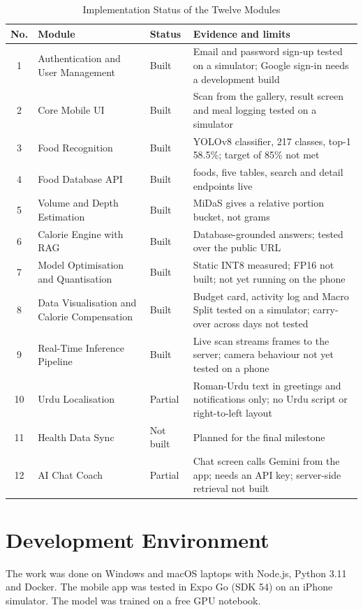 \begin{table}[H]
\centering
\caption{Implementation Status of the Twelve Modules}
\label{tab:status}
\small
\begin{tabularx}{\textwidth}{|c|>{\raggedright\arraybackslash}p{4.2cm}|>{\raggedright\arraybackslash}p{2.2cm}|>{\raggedright\arraybackslash}X|}
\hline
\textbf{No.} & \textbf{Module} & \textbf{Status} & \textbf{Evidence and limits} \\ \hline
1 & Authentication and User Management & Built & Email and password sign-up tested on a simulator; Google sign-in needs a development build \\ \hline
2 & Core Mobile UI & Built & Scan from the gallery, result screen and meal logging tested on a simulator \\ \hline
3 & Food Recognition & Built & YOLOv8 classifier, 217 classes, top-1 58.5\%; target of 85\% not met \\ \hline
4 & Food Database API & Built & 160 foods, five tables, search and detail endpoints live \\ \hline
5 & Volume and Depth Estimation & Built & MiDaS gives a relative portion bucket, not grams \\ \hline
6 & Calorie Engine with RAG & Built & Database-grounded answers; tested over the public URL \\ \hline
7 & Model Optimisation and Quantisation & Built & Static INT8 measured; FP16 not built; not yet running on the phone \\ \hline
8 & Data Visualisation and Calorie Compensation & Built & Budget card, activity log and Macro Split tested on a simulator; carry-over across days not tested \\ \hline
9 & Real-Time Inference Pipeline & Built & Live scan streams frames to the server; camera behaviour not yet tested on a phone \\ \hline
10 & Urdu Localisation & Partial & Roman-Urdu text in greetings and notifications only; no Urdu script or right-to-left layout \\ \hline
11 & Health Data Sync & Not built & Planned for the final milestone \\ \hline
12 & AI Chat Coach & Partial & Chat screen calls Gemini from the app; needs an API key; server-side retrieval not built \\ \hline
\end{tabularx}
\end{table}

\section{Development Environment}
The work was done on Windows and macOS laptops with Node.js, Python 3.11 and Docker. The mobile app was
tested in Expo Go (SDK 54) on an iPhone simulator. The model was trained on a free GPU notebook.

